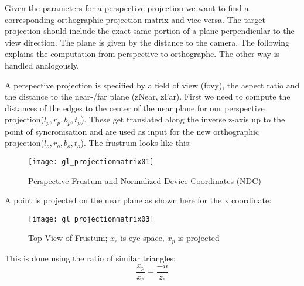 \documentclass{article}
\begin{document}
Given the parameters for a perspective projection we want to find a corresponding orthographic projection matrix and vice versa. The target projection should include the exact same portion of a plane perpendicular to the view direction. The plane is given by the distance to the camera.
The following explains the computation from perspective to orthographc. The other way is handled analogously.

A perspective projection is specified by a field of view (fovy), the aspect ratio and the distance to the near-/far plane (zNear, zFar). First we need to compute the distances of the edges to the center of the near plane for our perspective projection($l_p,r_p,b_p,t_p$). These get translated along the inverse z-axis up to the point of syncronisation and are used as input for the new orthographic projection($l_o,r_o,b_o,t_o$). The frustrum looks like this:
\begin{figure}[H]
  \centering
  \texttt{[image: gl\_projectionmatrix01]}
  \caption{Perspective Frustum and Normalized Device Coordinates (NDC)}
\end{figure}

A point is projected on the near plane as shown here for the x coordinate:
\begin{figure}[H]
  \centering
  \texttt{[image: gl\_projectionmatrix03]}
  \caption{Top View of Frustum; $x_e$ is eye space, $x_p$ is projected}
\end{figure}

This is done using the ratio of similar triangles:
\begin{equation}
    \label{similar_triangles}
    \frac{x_p}{x_e} = \frac{-n}{z_e}
\end{equation}
\end{document}
